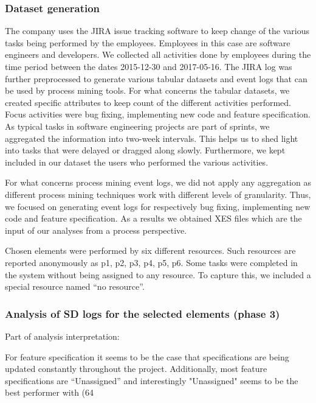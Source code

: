 \subsubsection{Dataset generation}

The company uses the JIRA issue tracking software to keep change of the various tasks being performed by the employees. Employees in this case are software engineers and developers. We collected all activities done by employees during the time period between the dates 2015-12-30 and 2017-05-16.  The JIRA log was further preprocessed to generate various tabular datasets and event logs that can be used by process mining tools. For what concerns the tabular datasets, we created specific attributes to keep count of the different activities performed. Focus activities were bug fixing, implementing new code and feature specification. As typical tasks in software engineering projects are part of sprints, we aggregated the information into two-week intervals. This helps us to shed light into tasks that were delayed or dragged along slowly. Furthermore, we kept included in our dataset the users who performed the various activities.  

For what concerns process mining event logs, we did not apply any aggregation as different process mining techniques work with different levels of granularity. Thus, we focused on generating event logs for respectively bug fixing, implementing new code and feature specification. As a results we obtained XES files which are the input of our analyses from a process perspective. 

Chosen elements were performed by six different resources. Such resources are reported anonymously as p1, p2, p3, p4, p5, p6. Some tasks were completed in the system without being assigned to any resource. To capture this, we included a special resource named “no resource”.  

\subsubsection{Analysis of SD logs for the selected elements (phase 3)}

Part of analysis interpretation: 

For feature specification it seems to be the case that specifications are being updated constantly throughout the project. Additionally, most feature specifications are “Unassigned” and interestingly "Unassigned" seems to be the best performer with (64%

